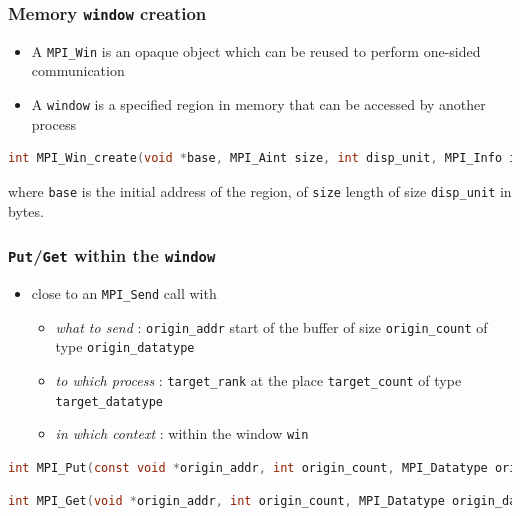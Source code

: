 \begin{frame}[containsverbatim]
\frametitle{Memory \texttt{window} creation}
\begin{itemize}
	\item {A \verb+MPI_Win+ is an opaque object which can be reused to perform one-sided communication}
	\item {A \verb+window+ is a specified region in memory that can be accessed by another process}
\end{itemize}

\begin{lstlisting}[language=C,frame=lines]
int MPI_Win_create(void *base, MPI_Aint size, int disp_unit, MPI_Info info, MPI_Comm comm, MPI_Win *win)
\end{lstlisting}

where \verb+base+ is the initial address of the region, of \verb+size+ length of size \verb+disp_unit+ in bytes.

\end{frame}

\begin{frame}[containsverbatim]
\frametitle{\texttt{Put}/\texttt{Get} within the \texttt{window}}
\begin{itemize}
	\item {close to an \verb+MPI_Send+ call with 
		\begin{itemize}
			\item {\textit{what to send} : \verb+origin_addr+ start of the buffer of size \verb+origin_count+ of type \verb+origin_datatype+}
			\item {\textit{to which process} : \verb+target_rank+ at the place \verb+target_count+ of type \verb+target_datatype+}
			\item {\textit{in which context} : within the window \verb+win+}
		\end{itemize}
	}
\end{itemize}

\begin{lstlisting}[language=C,frame=lines]
int MPI_Put(const void *origin_addr, int origin_count, MPI_Datatype origin_datatype, int target_rank, MPI_Aint target_disp, int target_count, MPI_Datatype target_datatype, MPI_Win win)
\end{lstlisting}

\begin{lstlisting}[language=C,frame=lines]
int MPI_Get(void *origin_addr, int origin_count, MPI_Datatype origin_datatype, int target_rank, MPI_Aint target_disp, int target_count, MPI_Datatype target_datatype, MPI_Win win)
\end{lstlisting}


\end{frame}


